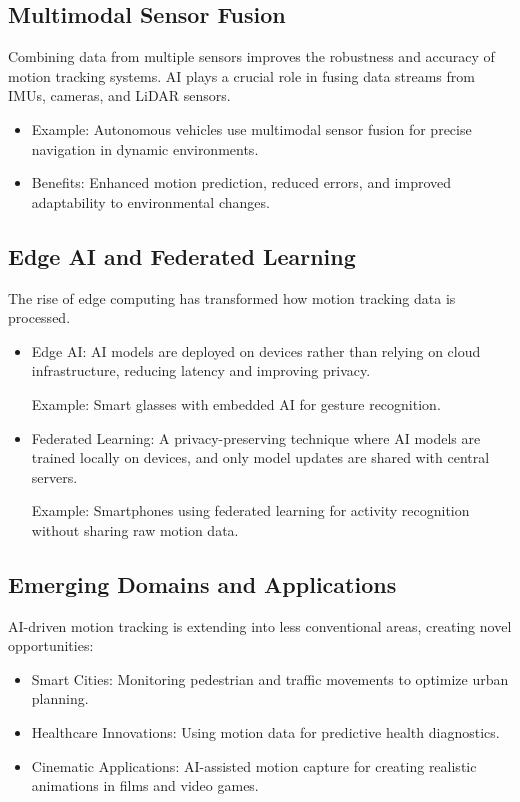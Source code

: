
\subsection{Multimodal Sensor Fusion}
Combining data from multiple sensors improves the robustness and accuracy of motion tracking systems. AI plays a crucial role in fusing data streams from IMUs, cameras, and LiDAR sensors.
\begin{itemize}
    \item Example: Autonomous vehicles use multimodal sensor fusion for precise navigation in dynamic environments.
    \item Benefits: Enhanced motion prediction, reduced errors, and improved adaptability to environmental changes.
\end{itemize}

\subsection{Edge AI and Federated Learning}
The rise of edge computing has transformed how motion tracking data is processed.
\begin{itemize}
    \item Edge AI: AI models are deployed on devices rather than relying on cloud infrastructure, reducing latency and improving privacy.
    
    Example: Smart glasses with embedded AI for gesture recognition.
    
    \item Federated Learning: A privacy-preserving technique where AI models are trained locally on devices, and only model updates are shared with central servers.
    
    Example: Smartphones using federated learning for activity recognition without sharing raw motion data.
\end{itemize}

\subsection{Emerging Domains and Applications}
AI-driven motion tracking is extending into less conventional areas, creating novel opportunities:
\begin{itemize}
    \item Smart Cities: Monitoring pedestrian and traffic movements to optimize urban planning.
    \item Healthcare Innovations: Using motion data for predictive health diagnostics.
    \item Cinematic Applications: AI-assisted motion capture for creating realistic animations in films and video games.
\end{itemize}

